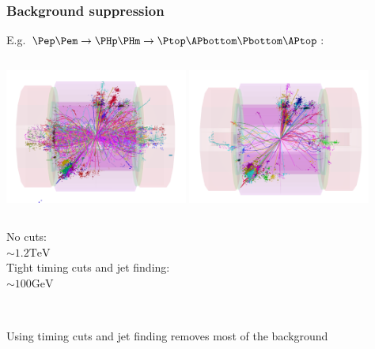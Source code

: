 \documentclass{beamer}
\begin{document}
\begin{frame}
\frametitle{Background suppression}
E.g. $\Pep\Pem\to\PHp\PHm\to\Ptop\APbottom\Pbottom\APtop$:
\begin{columns}[c]
\column{6cm}
\centering
\includegraphics[width=6cm]{../SIDWorkshop/HH2.pdf}
\column{6cm}
\centering
\includegraphics[width=6cm]{../SIDWorkshop/HH2tight.pdf}
\end{columns}
\begin{columns}[c]
\column{6cm}
\centering
No cuts:\\ \alert{$\sim1.2\textrm{TeV}$}\\
{\color{blue}{\scriptsize 10ns window}}
\column{6cm}
\centering
Tight timing cuts and jet finding:\\ \alert{$\sim100\textrm{GeV}$}
\end{columns}
~\\
\alert{Using timing cuts and jet finding removes most of the background}
\end{frame}
\end{document}
